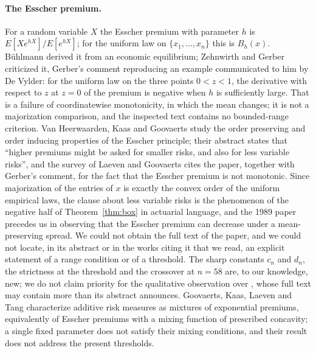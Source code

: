 \documentclass[11pt,a4paper]{article}
\theoremstyle{plain}
\theoremstyle{definition}
\begin{document}
\paragraph{The Esscher premium.}
For a random variable $X$ the Esscher premium with parameter $h$ is $E[Xe^{hX}]/E[e^{hX}]$; for the uniform law on $\{x_1,\dots,x_n\}$ this is $B_h(x)$. B\"uhlmann \cite{Buhlmann1980} derived it from an economic equilibrium; Zehnwirth \cite{Zehnwirth1981} and Gerber \cite{Gerber1981} criticized it, Gerber's comment reproducing an example communicated to him by De Vylder: for the uniform law on the three points $0<z<1$, the derivative with respect to $z$ at $z=0$ of the premium is negative when $h$ is sufficiently large. That is a failure of coordinatewise monotonicity, in which the mean changes; it is not a majorization comparison, and the inspected text contains no bounded-range criterion. Van Heerwaarden, Kaas and Goovaerts \cite{vanHeerwaardenKaasGoovaerts1989} study the order preserving and order inducing properties of the Esscher principle; their abstract states that ``higher premiums might be asked for smaller risks, and also for less variable risks'', and the survey of Laeven and Goovaerts \cite{LaevenGoovaerts2008} cites the paper, together with Gerber's comment, for the fact that the Esscher premium is not monotonic. Since majorization of the entries of $x$ is exactly the convex order of the uniform empirical laws, the clause about less variable risks is the phenomenon of the negative half of Theorem~\ref{thm:box} in actuarial language, and the 1989 paper precedes us in observing that the Esscher premium can decrease under a mean-preserving spread. We could not obtain the full text of the paper, and we could not locate, in its abstract or in the works citing it that we read, an explicit statement of a range condition or of a threshold. The sharp constants $c_n$ and $d_n$, the strictness at the threshold and the crossover at $n=58$ are, to our knowledge, new; we do not claim priority for the qualitative observation over \cite{vanHeerwaardenKaasGoovaerts1989}, whose full text may contain more than its abstract announces. Goovaerts, Kaas, Laeven and Tang \cite{GoovaertsKaasLaevenTang2004} characterize additive risk measures as mixtures of exponential premiums, equivalently of Esscher premiums with a mixing function of prescribed concavity; a single fixed parameter does not satisfy their mixing conditions, and their result does not address the present thresholds.
\end{document}
